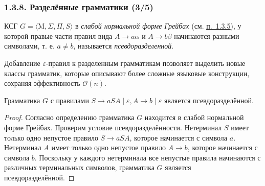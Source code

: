 \documentclass[mathserif,12pt,aspectratio=169]{beamer}
\def\emразделенной{\em разделенной}
\renewcommand{\index}[1]{}
\def\em#1{\it\color{blue}#1}
\def\odmkey#1#2{{\it\color{red} #1}\index{#2}}
\let\cal\mathcal
\def\DMref#1#2{{\color{blue}\underline{\hyperlink{#2}{#1}}}}
\begin{document}
\begin{frame}
\frametitle{1.3.8. Разделённые грамматики (3/5)}

КСГ $G=\langle \mathrm{M}, \Sigma, \Pi, S \rangle$ в {\em слабой нормальной форме Грейбах} (см. \DMref{п.~1.3.5}{1.3.5.}), у которой правые части правил вида \( A \to a\alpha \) и \( A \to b\beta \) начинаются разными символами, т. е. \( a \neq b \), называется \odmkey{псевдоразделенной}{Грамматика!Псевдоразделенная}.

\begin{remark}
    Добавление $\varepsilon$-правил к разделенным грамматикам позволяет выделить новые классы грамматик, которые описывают более сложные языковые конструкции, сохраняя эффективность $\cal{O}(n)$.
\end{remark}

\smallskip

\begin{example}
Грамматика $G$ с правилами $S \to aSA \mid \varepsilon, A \to b \mid \varepsilon$
является псевдоразделённой.
\end{example} 
\begin{proof}
Согласно определению грамматика $  G  $ находится в слабой нормальной форме Грейбах.
Проверим условие псевдоразделённости.
Нетерминал $ S $ имеет только одно непустое правило $ S \to aSA $, которое начинается с символа $ a $.
Нетерминал $ A $ имеет только одно непустое правило $ A \to b $, которое начинается с символа $ b $.
Поскольку у каждого нетерминала все непустые правила начинаются с различных терминальных символов, грамматика $  G  $ является псевдоразделённой.
\end{proof}


\end{frame}
\end{document}
